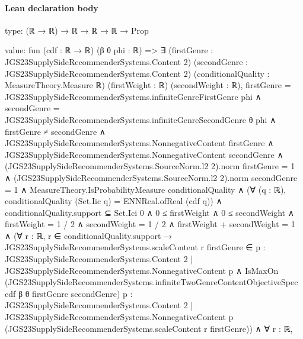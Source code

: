 \documentclass[10pt]{article}
\begin{document}
\paragraph{Lean declaration body}
\begin{ReviewVerbatim}
type:
(ℝ → ℝ) → ℝ → ℝ → ℝ → Prop

value:
fun (cdf : ℝ → ℝ) (β θ phi : ℝ) =>
  ∃ (firstGenre : JGS23SupplySideRecommenderSystems.Content 2) (secondGenre :
    JGS23SupplySideRecommenderSystems.Content 2) (conditionalQuality : MeasureTheory.Measure ℝ) (firstWeight : ℝ)
    (secondWeight : ℝ),
    firstGenre = JGS23SupplySideRecommenderSystems.infiniteGenreFirstGenre phi ∧
      secondGenre = JGS23SupplySideRecommenderSystems.infiniteGenreSecondGenre θ phi ∧
        firstGenre ≠ secondGenre ∧
          JGS23SupplySideRecommenderSystems.NonnegativeContent firstGenre ∧
            JGS23SupplySideRecommenderSystems.NonnegativeContent secondGenre ∧
              (JGS23SupplySideRecommenderSystems.SourceNorm.l2 2).norm firstGenre = 1 ∧
                (JGS23SupplySideRecommenderSystems.SourceNorm.l2 2).norm secondGenre = 1 ∧
                  MeasureTheory.IsProbabilityMeasure conditionalQuality ∧
                    (∀ (q : ℝ), conditionalQuality (Set.Iic q) = ENNReal.ofReal (cdf q)) ∧
                      conditionalQuality.support ⊆ Set.Ici 0 ∧
                        0 ≤ firstWeight ∧
                          0 ≤ secondWeight ∧
                            firstWeight = 1 / 2 ∧
                              secondWeight = 1 / 2 ∧
                                firstWeight + secondWeight = 1 ∧
                                  (∀ {{r : ℝ}},
                                      r ∈ conditionalQuality.support →
                                        JGS23SupplySideRecommenderSystems.scaleContent r firstGenre ∈
                                            {p : JGS23SupplySideRecommenderSystems.Content 2 |
                                              JGS23SupplySideRecommenderSystems.NonnegativeContent p} ∧
                                          IsMaxOn
                                            (JGS23SupplySideRecommenderSystems.infiniteTwoGenreContentObjectiveSpec cdf
                                              β θ firstGenre secondGenre)
                                            {p : JGS23SupplySideRecommenderSystems.Content 2 |
                                              JGS23SupplySideRecommenderSystems.NonnegativeContent p}
                                            (JGS23SupplySideRecommenderSystems.scaleContent r firstGenre)) ∧
                                    ∀ {{r : ℝ}},

\end{ReviewVerbatim}
\end{document}
